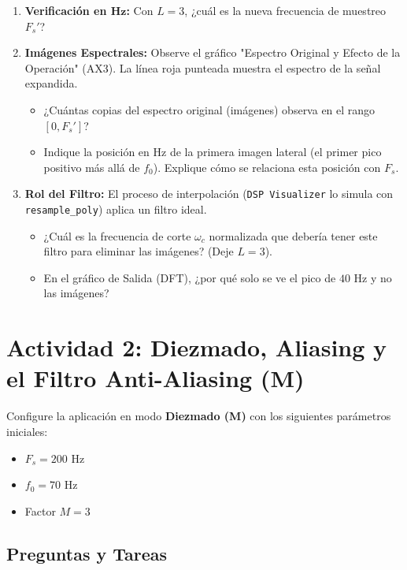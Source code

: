 \documentclass[11pt, a4paper]{article}
\begin{document}
\begin{enumerate}
    \item \textbf{Verificación en $\mathbf{Hz}$:} Con $L=3$, ¿cuál es la nueva frecuencia de muestreo $F_s'$?
    \item \textbf{Imágenes Espectrales:} Observe el gráfico "Espectro Original y Efecto de la Operación" (AX3). La línea roja punteada muestra el espectro de la señal expandida.
    \begin{itemize}
        \item ¿Cuántas copias del espectro original (imágenes) observa en el rango $[0, F_s']$?
        \item Indique la posición en $\text{Hz}$ de la primera imagen lateral (el primer pico positivo más allá de $f_0$). Explique cómo se relaciona esta posición con $F_s$.
    \end{itemize}
    \item \textbf{Rol del Filtro:} El proceso de interpolación (\texttt{DSP Visualizer} lo simula con \texttt{resample\_poly}) aplica un filtro ideal.
    \begin{itemize}
        \item ¿Cuál es la frecuencia de corte $\omega_c$ normalizada que debería tener este filtro para eliminar las imágenes? (Deje $L=3$).
        \item En el gráfico de Salida (DFT), ¿por qué solo se ve el pico de $40 \text{ Hz}$ y no las imágenes?
    \end{itemize}
\end{enumerate}

\section{Actividad 2: Diezmado, Aliasing y el Filtro Anti-Aliasing ($\mathbf{M}$)}

Configure la aplicación en modo \textbf{Diezmado (M)} con los siguientes parámetros iniciales:
\begin{itemize}
    \item $F_s = 200 \text{ Hz}$
    \item $f_0 = 70 \text{ Hz}$
    \item Factor $M = 3$
\end{itemize}

\subsection{Preguntas y Tareas}
\end{document}
